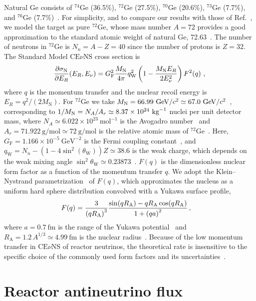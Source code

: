 \documentclass[a4paper,11pt]{article}
\renewcommand\({\left(}
\renewcommand\){\right)}
\renewcommand\[{\left[}
\renewcommand\]{\right]}
\newcommand{\tx}{\text}
\newcommand{\al}[1]{\begin{align}#1\end{align}}
\newcommand{\paren}[1]{\left(#1\right)}
\newcommand{\pn}[1]{\left(#1\right)}
\newcommand{\fn}[1]{\!\paren{#1}} %
\newcommand{\p}{\partial}
\theoremstyle{definition}
\newcommand{\ov}{\over}
\newcommand{\GeV}{\text{GeV}}
\newcommand{\CEnNS}{\text{CE}\nu\text{NS}}
\newcommand{\fm}{\text{fm}}
\newcommand{\g}{\text{g}}
\newcommand{\kg}{\text{kg}}
\begin{document}
 Natural Ge consists of $^{74}$Ge (36.5\%), $^{72}$Ge (27.5\%), $^{70}$Ge (20.6\%), $^{73}$Ge (7.7\%), and $^{76}$Ge (7.7\%)~\cite{Meija:2016isotopic}. For simplicity, and to compare our results with those of Ref.~\cite{Liao:2023kyy}, we model the target as pure $^{72}$Ge, whose mass number $A = 72$ provides a good approximation to the standard atomic weight of natural Ge, 72.63~\cite{IUPAC}. The number of neutrons in $^{72}$Ge is $N_n = A - Z = 40$ since the number of protons is  $Z = 32$.
The Standard Model $\CEnNS$ cross section is~\cite{1974PhRvD...9.1389F}
\al{
    {\p \sigma_{\rm N}\ov \p E_{R}}\fn{E_{R}, E_\nu} = {G_\text{F}^2}{{M_\text{N}}\ov 4\pi} q_\text{W}^2 \pn{1 - {{M_\text{N}}E_{R}\ov 2 E_\nu^2}}F^2\fn{q}\,,\label{crosssection}
}
where $q$ is the momentum transfer and the nuclear recoil energy is $E_R = q^2/\pn{2M_\text{N}}$. For $^{72}$Ge we take $M_{\rm N}=66.99~\GeV/c^2 \simeq 67.0~\GeV/c^2$~\cite{AME2020}, corresponding to
$1/M_{\rm N} = N_A/A_r \simeq 8.37 \times 10^{24}~\kg^{-1}$ nuclei per unit detector mass, where $N_A \simeq 6.022 \times 10^{23}~\mathrm{mol}^{-1}$ is the Avogadro number~\cite{ParticleDataGroup:2024cfk} and $A_r =71.922~\g/\mathrm{mol} \simeq 72~\g/\mathrm{mol}$ is the relative atomic mass of $^{72}$Ge~\cite{IUPAC}. Here, $G_\text{F} = 1.166\times 10^{-5}~\GeV^{-2}$ is the Fermi coupling constant~\cite{ParticleDataGroup:2024cfk}, and $q_\text{W} = N_n - \pn{1 - 4\sin^2\fn{\theta_\text{W}}}Z \simeq 38.6$ is the weak charge, which depends on the weak mixing angle $\sin^2\theta_{\tx{W}} \simeq 0.23873$~\cite{ParticleDataGroup:2024cfk}.
$F\fn{q}$ is the dimensionless nuclear form factor as a function of the momentum transfer $q$. We adopt the Klein--Nystrand parametrization~\cite{PhysRevLett.84.2330} of $F\fn{q}$, which approximates the nucleus as a uniform hard sphere distribution convolved with a Yukawa surface profile,
\al{
    F\fn{q}
    &= {3\ov \pn{qR_\text{A}}^3}
    {{\sin\fn{qR_\text{A}} - {qR_\text{A}}\cos\fn{qR_\text{A}}}\ov 1 + \pn{qa}^2}\,,
}
where $a = 0.7~\fm$ is the range of the Yukawa potential~\cite{PhysRevLett.84.2330} and $R_\text{A} = 1.2\,A^{1/3} \simeq 4.99~\fm$ is the nuclear radius~\cite{Blatt:1952ije}. Because of the low momentum transfer in $\CEnNS$ of reactor neutrinos, the theoretical rate is insensitive to the specific choice of the commonly used form factors and its uncertainties~\cite{AristizabalSierra:2019zmy}.

\section{Reactor antineutrino flux}
\label{AppB:theoretical-nu-flux}
\end{document}

